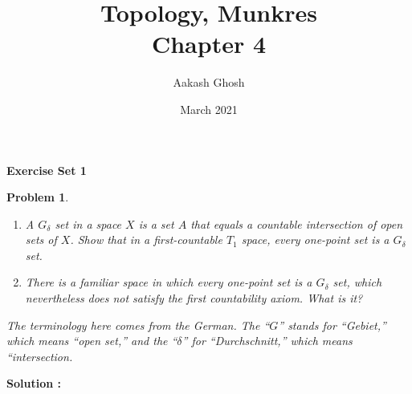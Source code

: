 \documentclass{article}
\title{Topology, Munkres\\ Chapter 4}
\author{Aakash Ghosh}
\date{March 2021}
\newtheorem{problem}{Problem}
\begin{document}
\maketitle
\begin{center}
    \Large{\textbf{Exercise Set 1}}
\end{center}
\begin{tcolorbox}
\begin{problem}
\begin{enumerate}
    \item A $G_\delta$ set in a space $X$ is a set $A$ that equals a countable intersection of open sets of $X$. Show that in a first-countable $T_1$ space, every one-point set is a $G_\delta$ set.
    \item There is a familiar space in which every one-point set is a $G_\delta$ set, which nevertheless does not satisfy the first countability axiom. What is it?
\end{enumerate}
The terminology here comes from the German. The “$G$” stands for “Gebiet,”
which means “open set,” and the “$\delta$” for “Durchschnitt,” which means “intersection.
\end{problem}
\end{tcolorbox}
\textbf{Solution :}
\end{document}

